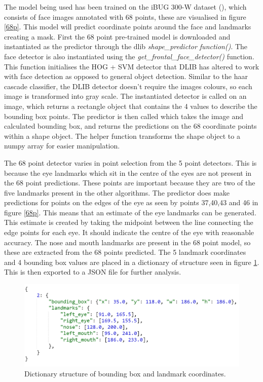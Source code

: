 \documentclass{l4proj}
\begin{document}
The model being used has been trained on the iBUG 300-W dataset (\cite{300w}), which consists of face images annotated with 68 points, these are visualised in figure \ref{68p}. This model will predict coordinate points around the face and landmarks creating a mask. First the 68 point pre-trained model is downloaded and instantiated as the predictor through the dlib \textit{shape\_predictor function()}. The face detector is also instantiated using the \textit{get\_frontal\_face\_detector()} function. This function initialises the HOG + SVM detector that DLIB has altered to work with face detection as opposed to general object detection. Similar to the haar cascade classifier, the DLIB detector doesn't require the images colours, so each image is transformed into gray scale. The instantiated detector is called on an image, which returns a rectangle object that contains the 4 values to describe the bounding box points. The predictor is then called which takes the image and calculated bounding box, and returns the predictions on the 68 coordinate points within a shape object. The helper function transforms the shape object to a numpy array for easier manipulation.

The 68 point detector varies in point selection from the 5 point detectors. This is because the eye landmarks which sit in the centre of the eyes are not present in the 68 point predictions. These points are important because they are two of the five landmarks present in the other algorithms. The predictor does make predictions for points on the edges of the eye as seen by points 37,40,43 and 46 in figure \ref{68p}. This means that an estimate of the eye landmarks can be generated. This estimate is created by taking the midpoint between the line connecting the edge points for each eye. It should indicate the centre of the eye with reasonable accuracy. The nose and mouth landmarks are present in the 68 point model, so these are extracted from the 68 points predicted. The 5 landmark coordinates and 4 bounding box values are placed in a dictionary of structure seen in figure \ref{dict}. This is then exported to a JSON file for further analysis.

\begin{figure}[h!]
  \centering
  \begin{minipage}{0.8\textwidth}
    \includegraphics[width=\textwidth]{images/dictionary_structure.PNG}
    \caption{Dictionary structure of bounding box and landmark coordinates.}
    \label{dict}
  \end{minipage}
  \hfill
\end{figure}
\end{document}
